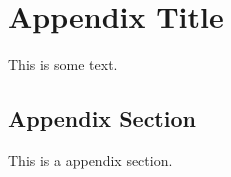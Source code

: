 \chapter{Appendix Title}\label{sec:appendix}

This is some text.

\newpage

\section{Appendix Section}
\label{sec:appendix_selection}

This is a appendix section.
